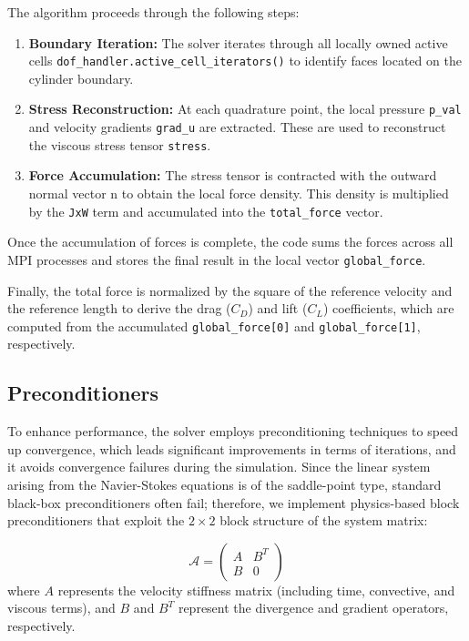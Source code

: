 \documentclass[11pt,a4paper]{article}
\begin{document}
The algorithm proceeds through the following steps: 
\begin{enumerate} 
    \item \textbf{Boundary Iteration:} The solver iterates through all locally owned active cells \texttt{dof\_handler.active\_cell\_iterators()} to identify faces located on the cylinder boundary. 
    \item \textbf{Stress Reconstruction:} At each quadrature point, the local pressure \texttt{p\_val} and velocity gradients \texttt{grad\_u} are extracted. These are used to reconstruct the viscous stress tensor \texttt{stress}. 
    \item \textbf{Force Accumulation:} The stress tensor is contracted with the outward normal vector n to obtain the local force density. This density is multiplied by the \texttt{JxW} term and accumulated into the \texttt{total\_force} vector. 
\end{enumerate}

Once the accumulation of forces is complete, the code sums the forces across all MPI processes and stores the final result in the local vector \texttt{global\_force}.

Finally, the total force is normalized by the square of the reference velocity and the reference length to derive the drag ($C_D$) and lift ($C_L$) coefficients, which are computed from the accumulated \texttt{global\_force[0]} and \texttt{global\_force[1]}, respectively.

\subsection{Preconditioners}

To enhance performance, the solver employs preconditioning techniques to speed up convergence, which leads significant improvements in terms of iterations, and it avoids convergence failures during the simulation. Since the linear system arising from the Navier-Stokes equations is of the saddle-point type, standard black-box preconditioners often fail; therefore, we implement physics-based block preconditioners that exploit the $2 \times 2$ block structure of the system matrix:

\begin{equation}
    \mathcal{A} = 
    \begin{pmatrix} 
    A & B^T \\ 
    B & 0 
    \end{pmatrix}
\end{equation}
where $A$ represents the velocity stiffness matrix (including time, convective, and viscous terms), and $B$ and $B^T$ represent the divergence and gradient operators, respectively.
\end{document}
